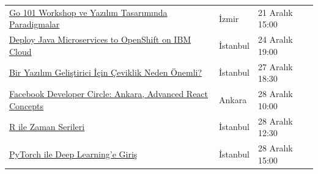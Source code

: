\documentclass[11pt]{article}
\begin{document}
\begin{longtable}{|p{8cm}|l|l|}
\href{https://www.meetup.com/IzmirGophers/events/267057206/}{Go 101 Workshop ve Yazılım Tasarımında Paradigmalar} & İzmir & 21 Aralık 15:00\\
\href{https://www.meetup.com/IBMCloudTR/events/266704608/}{Deploy Java Microservices to OpenShift on IBM Cloud} & İstanbul & 24 Aralık 19:00\\
\href{https://www.meetup.com/ING-\%25C4\%25B0novasyon-Merkezi/events/266639841/}{Bir Yazılım Geliştirici İçin Çeviklik Neden Önemli?} & İstanbul & 27 Aralık 18:30\\
\href{https://www.meetup.com/Facebook-Developer-Circle-Ankara/events/267134880/}{Facebook Developer Circle: Ankara, Advanced React Concepts} & Ankara & 28 Aralık 10:00\\
\href{https://www.meetup.com/rladies-istanbul/events/267184117/}{R ile Zaman Serileri} & İstanbul & 28 Aralık 12:30\\
\href{https://www.meetup.com/Facebook-Developer-Circle-Istanbul/events/267037979/}{PyTorch ile Deep Learning'e Giriş} & İstanbul & 28 Aralık 15:00\\
\hline
\end{longtable}
\end{document}
